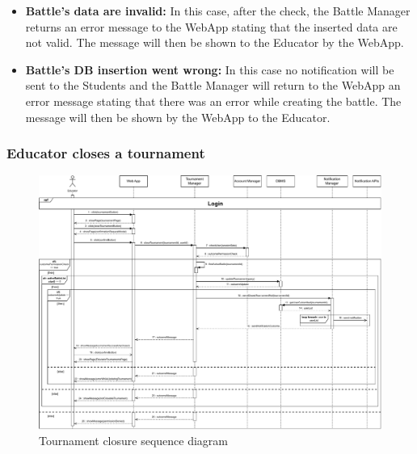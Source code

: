 \documentclass{article}
\begin{document}
{\begin{itemize}
            tournament's creator or has not been granted access to it from another collegue, 
            the Battle Manager will return an error message stating that the the procedure was 
            denied. 
            The message will be shown by the WebApp to the Educator and finally
            the User will be redirected to the login page (omitted for simplicity).
            \item \textbf{Battle's data are invalid:} In this case, after the check, the Battle 
            Manager returns an error message to the WebApp stating that the 
            inserted data are not valid. The message will then be shown to the Educator by 
            the WebApp.
            \item \textbf{Battle's DB insertion went wrong:} In this case no 
            notification will be sent to the Students and the Battle Manager will 
            return to the WebApp an error message stating that there was an error while 
            creating the battle.
            The message will then be shown by the WebApp to the Educator.
        \end{itemize}


    \subsubsection{Educator closes a tournament}
        \begin{figure}[H]
            \centering
            \hspace*{-4cm}\includegraphics[scale=0.65]{Sequence/Sequence7DD.pdf}
            \caption{Tournament closure sequence diagram}
            \label{fig:Sequence7DD}
        \end{figure}

}
\end{document}
